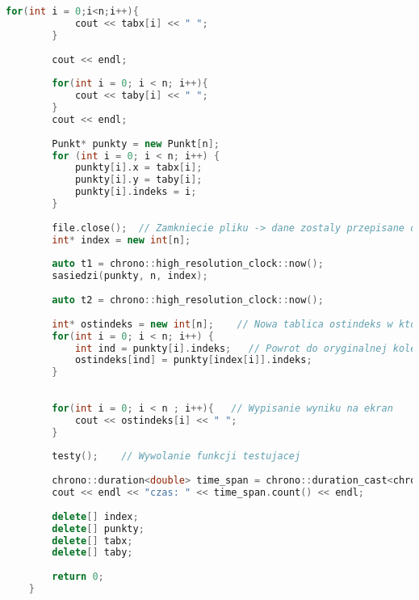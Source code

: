 \documentclass[12pt,twoside]{article}
\begin{document}
\begin{lstlisting}[language=C++,caption=Kod Dziel i Zwyciężaj,label={dividekod}]
        for(int i = 0;i<n;i++){
            cout << tabx[i] << " ";
        }
        
        cout << endl;
        
        for(int i = 0; i < n; i++){
            cout << taby[i] << " ";
        }
        cout << endl;
        
        Punkt* punkty = new Punkt[n];
        for (int i = 0; i < n; i++) {
            punkty[i].x = tabx[i];
            punkty[i].y = taby[i];
            punkty[i].indeks = i;
        }
        
        file.close();  // Zamkniecie pliku -> dane zostaly przepisane do tablic
        int* index = new int[n]; 
    
        auto t1 = chrono::high_resolution_clock::now();      
        sasiedzi(punkty, n, index);
        
        auto t2 = chrono::high_resolution_clock::now();
        
        int* ostindeks = new int[n];    // Nowa tablica ostindeks w ktorej bedzie przechowywany ostateczny wynik - w tablicy index wynik jest odpowiedni dla posortowanych punktow wzgledem x
        for(int i = 0; i < n; i++) {
            int ind = punkty[i].indeks;   // Powrot do oryginalnej kolejnosci osiagany jest za pomoca zapisanego wczesniej indeksu
            ostindeks[ind] = punkty[index[i]].indeks;
        }
    
          
        for(int i = 0; i < n ; i++){   // Wypisanie wyniku na ekran 
            cout << ostindeks[i] << " ";
        }
    
        testy();    // Wywolanie funkcji testujacej
        
        chrono::duration<double> time_span = chrono::duration_cast<chrono::duration<double>>(t2 - t1);
        cout << endl << "czas: " << time_span.count() << endl;
        
        delete[] index;
        delete[] punkty;
        delete[] tabx;
        delete[] taby;
        
        return 0;
    }
\end{lstlisting}
\end{document}
